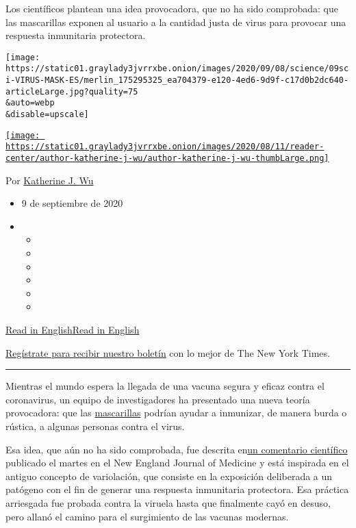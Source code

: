 Los científicos plantean una idea provocadora, que no ha sido
comprobada: que las mascarillas exponen al usuario a la cantidad justa
de virus para provocar una respuesta inmunitaria protectora.

\texttt{[image: https://static01.graylady3jvrrxbe.onion/images/2020/09/08/science/09sci-VIRUS-MASK-ES/merlin\_175295325\_ea704379-e120-4ed6-9d9f-c17d0b2dc640-articleLarge.jpg?quality=75\\\&auto=webp\\\&disable=upscale]}

\href{https://www.nytimes3xbfgragh.onion/by/katherine-j--wu}{\texttt{[image: https://static01.graylady3jvrrxbe.onion/images/2020/08/11/reader-center/author-katherine-j-wu/author-katherine-j-wu-thumbLarge.png]}}

Por
\href{https://www.nytimes3xbfgragh.onion/by/katherine-j--wu}{Katherine
J. Wu}

\begin{itemize}
\item
  9 de septiembre de 2020
\item
  \begin{itemize}
  \item
  \item
  \item
  \item
  \item
  \item
  \end{itemize}
\end{itemize}

\href{https://www.nytimes3xbfgragh.onion/2020/09/08/health/covid-masks-immunity.html}{Read
in
English}\href{https://www.nytimes3xbfgragh.onion/2020/09/08/health/covid-masks-immunity.html}{Read
in English}

\href{https://www.nytimes3xbfgragh.onion/newsletters/el-times}{Regístrate
para recibir nuestro boletín} con lo mejor de The New York Times.

\begin{center}\rule{0.5\linewidth}{\linethickness}\end{center}

Mientras el mundo espera la llegada de una vacuna segura y eficaz contra
el coronavirus, un equipo de investigadores ha presentado una nueva
teoría provocadora: que las
\href{https://www.nytimes3xbfgragh.onion/es/interactive/2020/espanol/coronavirus-mejores-mascarillas.html}{mascarillas}
podrían ayudar a inmunizar, de manera burda o rústica, a algunas
personas contra el virus.

Esa idea, que aún no ha sido comprobada, fue descrita
en\href{https://www.nejm.org/doi/full/10.1056/NEJMp2026913}{un
comentario científico} publicado el martes en el New England Journal of
Medicine y está inspirada en el antiguo concepto de variolación, que
consiste en la exposición deliberada a un patógeno con el fin de generar
una respuesta inmunitaria protectora. Esa práctica arriesgada fue
probada contra la viruela hasta que finalmente cayó en desuso, pero
allanó el camino para el surgimiento de las vacunas modernas.


